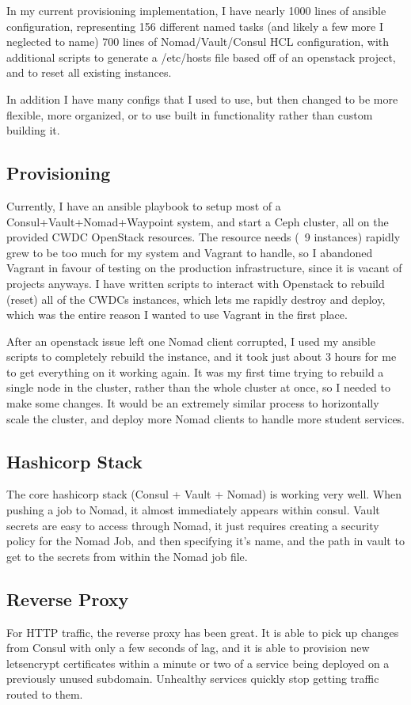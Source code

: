 \documentclass{article}
\begin{document}
In my current provisioning implementation, I have nearly 1000 lines of ansible configuration, representing 156 different named tasks (and likely a few more I neglected to name) 700 lines of Nomad/Vault/Consul HCL configuration, with additional scripts to generate a /etc/hosts file based off of an openstack project, and to reset all existing instances.

In addition I have many configs that I used to use, but then changed to be more flexible, more organized, or to use built in functionality rather than custom building it.

\subsection{Provisioning}
Currently, I have an ansible playbook to setup most of a Consul+Vault+Nomad+Waypoint system, and start a Ceph cluster, all on the provided CWDC OpenStack resources. The resource needs (~9 instances) rapidly grew to be too much for my system and Vagrant to handle, so I abandoned Vagrant in favour of testing on the production infrastructure, since it is vacant of projects anyways. I have written scripts to interact with Openstack to rebuild (reset) all of the CWDCs instances, which lets me rapidly destroy and deploy, which was the entire reason I wanted to use Vagrant in the first place.

After an openstack issue left one Nomad client corrupted, I used my ansible scripts to completely rebuild the instance, and it took just about 3 hours for me to get everything on it working again. It was my first time trying to rebuild a single node in the cluster, rather than the whole cluster at once, so I needed to make some changes. It would be an extremely similar process to horizontally scale the cluster, and deploy more Nomad clients to handle more student services.

\subsection{Hashicorp Stack}
The core hashicorp stack (Consul + Vault + Nomad) is working very well. When pushing a job to Nomad, it almost immediately appears within consul. Vault secrets are easy to access through Nomad, it just requires creating a security policy for the Nomad Job, and then specifying it's name, and the path in vault to get to the secrets from within the Nomad job file. 

\subsection{Reverse Proxy}
For HTTP traffic, the reverse proxy has been great. It is able to pick up changes from Consul with only a few seconds of lag, and it is able to provision new letsencrypt certificates within a minute or two of a service being deployed on a previously unused subdomain. Unhealthy services quickly stop getting traffic routed to them.
\end{document}
